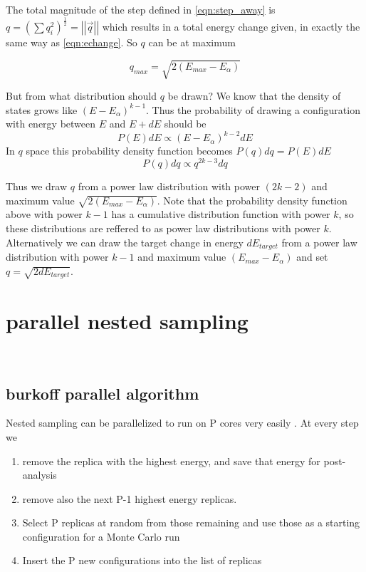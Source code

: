 \documentclass[a4paper]{article}
\begin{document}
The total magnitude of the step defined in \ref{eqn:step_away} is $q =
\left( \sum{q_i^2} \right)^{\frac{1}{2}} = \left|\left|\vec{q}\right|\right|$ which results in a total energy change given, in
exactly the same way as \ref{eqn:echange}.  So $q$ can be at maximum

\begin{equation}
  q_{max} = \sqrt{2 (E_{max} - E_{\alpha})}
\end{equation}


But from what distribution should $q$ be drawn?  
We know that the density of states grows like $(E-E_{\alpha})^{k-1}$.
Thus the probability of drawing a configuration with energy
between $E$ and $E+dE$ should be 
\begin{equation}
  P(E)dE \propto (E-E_{\alpha})^{k-2}dE
\end{equation}
In $q$ space this probability density function becomes $P(q)dq = P(E)dE$
\begin{equation}
  P(q)dq \propto q^{2k-3}dq
\end{equation}

Thus we draw $q$ from a power law distribution with power $(2k-2)$ and maximum
value $\sqrt{2 (E_{max} - E_{\alpha})}$.  Note that the probability density
function above with power $k-1$ has a cumulative distribution function with
power $k$, so these distributions are reffered to as power law distributions
with power $k$.
Alternatively we can draw the target change in energy $dE_{target}$ from a power law
distribution with power $k-1$ and maximum value $(E_{max} - E_{\alpha})$
and set $q = \sqrt{2 dE_{target}}$.


\section{parallel nested sampling}

~
\subsection{burkoff parallel algorithm}

Nested sampling can be parallelized to run on P cores very easily \cite{burkoff.2012}.
At every step we 

\begin{enumerate}
  \item remove the replica with the highest energy, and save that energy for post-analysis

  \item remove also the next P-1 highest energy replicas.

  \item Select P replicas at random from those remaining and use those as a starting
    configuration for a Monte Carlo run

  \item Insert the P new configurations into the list of replicas
\end{enumerate}
\end{document}
